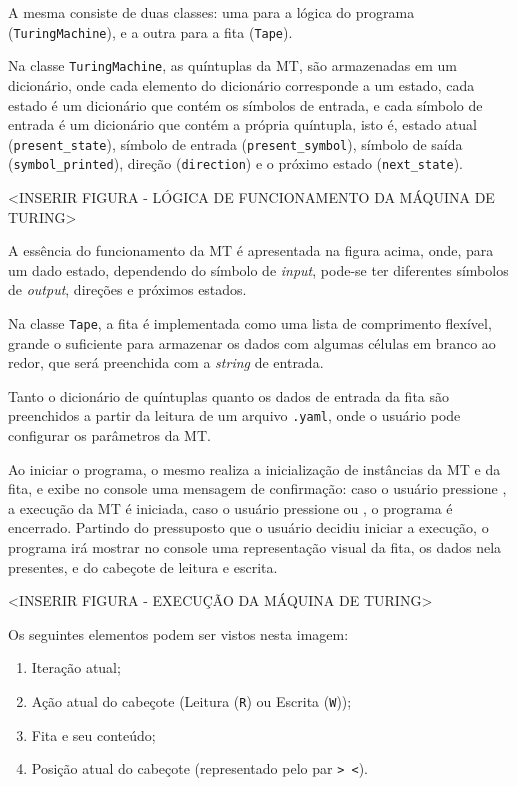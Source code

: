 \documentclass[12pt,fleqn]{article}
\begin{document}
A mesma consiste de duas classes: uma para a lógica do programa
(\verb|TuringMachine|), e a outra para a fita (\verb|Tape|).

Na classe \verb|TuringMachine|, as quíntuplas da MT, são armazenadas em um
dicionário, onde cada elemento do dicionário corresponde a um estado, cada
estado é um dicionário que contém os símbolos de entrada, e cada símbolo de
entrada é um dicionário que contém a própria quíntupla, isto é, estado atual
(\verb|present_state|), símbolo de entrada (\verb|present_symbol|), símbolo de
saída (\verb|symbol_printed|), direção (\verb|direction|) e o próximo estado
(\verb|next_state|).

<INSERIR FIGURA - LÓGICA DE FUNCIONAMENTO DA MÁQUINA DE TURING>

A essência do funcionamento da MT é apresentada na figura acima, onde, para um
dado estado, dependendo do símbolo de \textit{input}, pode-se ter diferentes
símbolos de \textit{output}, direções e próximos estados.

Na classe \verb|Tape|, a fita é implementada como uma lista de comprimento
flexível, grande o suficiente para armazenar os dados com algumas células em
branco ao redor, que será preenchida com a \textit{string} de entrada.

Tanto o dicionário de quíntuplas quanto os dados de entrada da fita são
preenchidos a partir da leitura de um arquivo \verb|.yaml|, onde o usuário pode
configurar os parâmetros da MT.

Ao iniciar o programa, o mesmo realiza a inicialização de instâncias da MT e da
fita, e exibe no console uma mensagem de confirmação: caso o usuário pressione
\keys{\return}, a execução da MT é iniciada, caso o usuário pressione
 ou , o programa é encerrado. Partindo do
pressuposto que o usuário decidiu iniciar a execução, o programa irá mostrar no
console uma representação visual da fita, os dados nela presentes, e do cabeçote
de leitura e escrita.

<INSERIR FIGURA - EXECUÇÃO DA MÁQUINA DE TURING>

Os seguintes elementos podem ser vistos nesta imagem:

\begin{enumerate}
    \item Iteração atual;
    \item Ação atual do cabeçote (Leitura (\verb|R|) ou Escrita (\verb|W|));
    \item Fita e seu conteúdo;
    \item Posição atual do cabeçote (representado pelo par \verb|> <|).
\end{enumerate}
\end{document}
